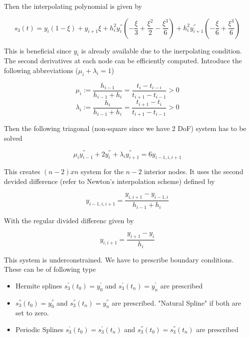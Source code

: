 \documentclass[
    a4paper,
    11pt
]{article}
\begin{document}
Then the interpolating polynomial is given by

\begin{equation}
    s_3(t) = y_i(1-\xi) + y_{i+1}\xi + h_i^2 y_i^{''} \left( -\frac{\xi}{3} +
    \frac{\xi^2}{2} - \frac{\xi^3}{6} \right) + h_i^2 y_{i+1}^{''} \left(
    -\frac{\xi}{6} + \frac{\xi^3}{6} \right)
\end{equation}

This is beneficial since $y_i$ is already available due to the inerpolating
condition. The second derivatives at each node can be efficiently computed.
Introduce the following abbreviations ($\mu_i + \lambda_i =1$)

\begin{equation}
    \mu_i := \frac{h_{i-1}}{h_{i-1} + h_i} = \frac{t_i -t_{i-i}}{t_{i+1} -
    t_{i-1}} > 0
\end{equation}
\begin{equation}
    \lambda_i := \frac{h_i}{h_{i-1} + h_i} = \frac{t_{i+1} - t_i}{t_{i+1} -
    t_{i-1}} > 0
\end{equation}

Then the following triagonal (non-square since we have 2 DoF) system has to be
solved

\begin{equation}
    \mu_i y_{i-1}^{''} + 2y_i^{''} + \lambda_i y_{i+1}^{''} = 6 y_{i-1,i,i+1}
\end{equation}

This creates $(n-2) x n$ system for the $n-2$ interior nodes. It uses the second
devided difference (refer to Newton's interpolation scheme) defined by

\begin{equation}
    y_{i-1,i,i+1} = \frac{y_{i,i+1} - y_{i-1,i}}{h_{i-1} + h_i}
\end{equation}

With the regular divided differenc given by

\begin{equation}
    y_{i, i+1} = \frac{y_{i+1} - y_i}{h_{i}}
\end{equation}

This system is underconstrained. We have to prescribe boundary conditions. These
can be of following type

\begin{itemize}
    \item Hermite splines $s_3^{'}(t_0) = y_0^{'}$ and $s_3^{'}(t_n) = y_n^{'}$ are
        prescribed
    \item $s_3^{''}(t_0) = y_0^{''}$ and $s_3^{''}(t_n) = y_n^{''}$ are
        prescribed. "Natural Spline" if both are set to zero.
    \item Periodic Splines $s_3^{'}(t_0) = s_3^{'}(t_n)$ and $s_3^{''}(t_0) =
        s_3^{''}(t_n)$ are prescribed
\end{itemize}
\end{document}
